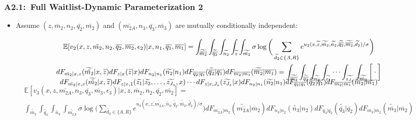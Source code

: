 \documentclass[12pt, aspectratio=169]{beamer}
\begin{document}
\begin{frame}[label=fwdp2]
\frametitle{A2.1:\ Full Waitlist-Dynamic Parameterization 2}
\small
\begin{itemize}
\item[$\bigstar$] Assume $(z,\ddot{m_2},n_2,\overline{q_2},\overline{m_2})$ and $(\overline{m_{2A}},n_3,\overline{q_3},\overline{m_3})$ are mutually conditionally independent:
\vspace{-10pt}
\end{itemize}
\scriptsize
\begin{multline*}
\mathbb{E}[v_2(x,z,\ddot{m_2},n_2,\overline{q_2},\overline{m_2},\epsilon_2)|x,n_1,\overline{q_1},\overline{m_1}] = \int_{\widetilde{\overline{m_2}}}\int_{\widetilde{\overline{q_2}}}\int_{\widetilde{n_2}}\int_{\widetilde z}\int_{\widetilde{\ddot{m_2}}}\sigma\log\bigg(\sum_{\widetilde{d_2}\in\{A,R\}}e^{u_2(x,\widetilde z,\widetilde{\ddot{m_2}},\widetilde{n_2},\widetilde{\overline{q_2}},\widetilde{\overline{m_2}},\widetilde{d_2})/\sigma}\bigg) \\
\vspace{-10pt}
dF_{\ddot{m_2}|x,z}(\widetilde{\ddot{m_2}}|x,\widetilde z)dF_{z|x}(\widetilde z|x)dF_{n_2|n_1}(\widetilde{n_2}|n_1)dF_{\overline{q_2}|\overline{q_1}}(\widetilde{\overline{q_2}}|\overline{q_1})dF_{\overline{m_2}|\overline{m_1}}(\widetilde{\overline{m_2}}|\overline{m_1}) = \int_{\widetilde{\overline{m_2}}}\int_{\widetilde{\overline{q_2}}}\int_{\widetilde{n_2}}\int_{\widetilde{z_1}}\cdots\int_{\widetilde{z_{J_z}}}\int_{\widetilde{\ddot{m_2}}}\bigg[\cdot\bigg] \\
\vspace{-10pt}
dF_{\ddot{m_2}|x,z}(\widetilde{\ddot{m_2}}|x,\widetilde z)dF_{z|x,1}(\widetilde{z_1}|\widetilde{z_2},\dots,\widetilde{z_{J_z}},x)\cdots dF_{z|x,{J_z}}(\widetilde{z_{J_z}}|x)dF_{n_2|n_1}(\widetilde{n_2}|n_1)dF_{\overline{q_2}|\overline{q_1}}(\widetilde{\overline{q_2}}|\overline{q_1})dF_{\overline{m_2}|\overline{m_1}}(\widetilde{\overline{m_2}}|\overline{m_1})
\end{multline*}
\vspace{-15pt}
\begin{multline*}
\mathbb{E}[v_3(x,z,\overline{m_{2A}},n_3,\overline{q_3},\overline{m_3},\epsilon_3)|x,z,\ddot{m_2},n_2,\overline{q_2},\overline{m_2}] = \\ \int_{\widetilde{\overline{m_3}}}\int_{\widetilde{\overline{q_3}}}\int_{\widetilde{n_3}}\int_{\widetilde{\overline{m_{2A}}}}\sigma\log\bigg(\sum_{\widetilde{d_3}\in\{A,R\}}e^{u_3(x,z,\widetilde{\overline{m_{2A}}},\widetilde{n_3},\widetilde{\overline{q_3}},\widetilde{\overline{m_3}},\widetilde{d_3})/\sigma}\bigg)dF_{\overline{m_{2A}}|\ddot{m_2}}(\widetilde{\overline{m_{2A}}}|\ddot{m_2})dF_{n_3|n_2}(\widetilde{n_3}|n_2)dF_{\overline{q_3}|\overline{q_2}}(\widetilde{\overline{q_3}}|\overline{q_2})dF_{\overline{m_3}|\overline{m_2}}(\widetilde{\overline{m_3}}|\overline{m_2})

\end{multline*}
\end{frame}
\end{document}
